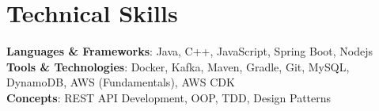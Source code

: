 \section{Technical Skills}
\begin{itemize}[leftmargin=0.15in, label={}]
    \small{\item{
        \textbf{Languages \& Frameworks}{: Java, C++, JavaScript, Spring Boot, Nodejs} \\
        \textbf{Tools \& Technologies}{: Docker, Kafka, Maven, Gradle, Git, MySQL, DynamoDB, AWS (Fundamentals), AWS CDK} \\
        \textbf{Concepts}{: REST API Development, OOP, TDD, Design Patterns}
    }}
\end{itemize}

